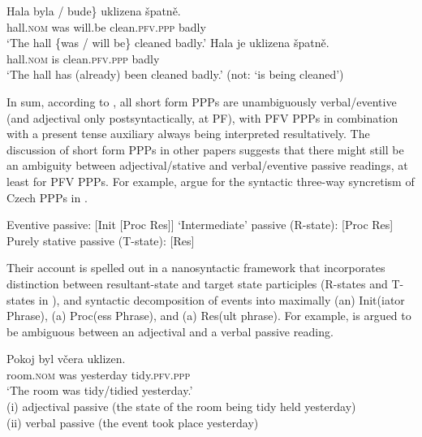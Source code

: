 \documentclass[output=paper,colorlinks,citecolor=brown]{langscibook}
\begin{document}
\ea\label{ex:pppresultative}
\ea
\gll Hala \minsp{\{} byla / bude\} uklizena špatně.\\
hall.\textsc{nom} {} was {} will.be clean.\textsc{pfv.ppp} badly\\
\glt `The hall \{was / will be\} cleaned badly.'
\ex
\gll Hala je uklizena špatně.\\
hall.\textsc{nom} is clean.\textsc{pfv.ppp} badly\\
\glt `The hall has (already) been cleaned badly.' (not: `is being cleaned')\label{ex:pppresultativeb}
\z 
\z 

\noindent In sum, according to \citet{veselovskakarlik}, all short form PPPs are unambiguously verbal/eventive (and adjectival only postsyntactically, at PF), with PFV PPPs in combination with a present tense auxiliary always being interpreted resultatively. The discussion of short form PPPs in other papers suggests that there might still be an ambiguity between adjectival/stative and verbal/eventive passive readings, at least for PFV PPPs. For example, \citet{cahamedova20} argue for the syntactic three-way syncretism of Czech PPPs in . 

\ea\label{ex:nano}
\ea Eventive passive: [Init [Proc Res]]
\ex `Intermediate' passive (R-state):  [Proc Res]
\ex Purely stative passive (T-state):  [Res]
\z 
\z 

\noindent Their account is spelled out in a nanosyntactic framework that incorporates  distinction between resultant-state and target state participles (R-states and T-states in ), and  syntactic decomposition of events into maximally (an) Init(iator Phrase), (a) Proc(ess Phrase), and (a) Res(ult phrase). %
For example,  \citep[adapted from][119]{cahamedova20} is argued to be ambiguous between an adjectival and a verbal passive reading. 

\ea\label{ex:pokoj}
\gll Pokoj byl včera uklizen.\\
	room.\textsc{nom} was yesterday tidy.\textsc{pfv.ppp}\\
\glt	`The room was tidy/tidied yesterday.'\\
	(i) adjectival passive (the state of the room being tidy held yesterday) \\
	(ii) verbal passive (the event took place yesterday)
\z 
\end{document}
